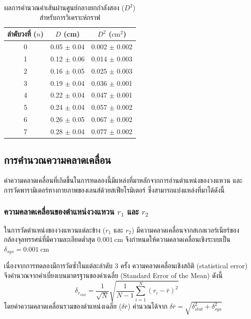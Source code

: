 \documentclass[11pt,a4paper]{article}
\begin{document}
\begin{table}[htbp]
\centering
\caption{ผลการคำนวณค่าเส้นผ่านศูนย์กลางยกกำลังสอง ($D^2$) สำหรับการวิเคราะห์กราฟ}
\renewcommand{\arraystretch}{1.2}
\begin{tabular}{|c|c|c|}
\hline
ลำดับวงที่ ($n$) & $D$ (cm) & $D^2$ ($\text{cm}^2$) \\
\hline
0 & 0.05 $\pm$ 0.04 & 0.002 $\pm$ 0.002 \\
1 & 0.12 $\pm$ 0.06 & 0.014 $\pm$ 0.003 \\
2 & 0.16 $\pm$ 0.05 & 0.025 $\pm$ 0.003 \\
3 & 0.19 $\pm$ 0.04 & 0.036 $\pm$ 0.001 \\
4 & 0.22 $\pm$ 0.04 & 0.047 $\pm$ 0.001 \\
5 & 0.24 $\pm$ 0.04 & 0.057 $\pm$ 0.002 \\
6 & 0.26 $\pm$ 0.05 & 0.067 $\pm$ 0.002 \\
7 & 0.28 $\pm$ 0.04 & 0.077 $\pm$ 0.002 \\
\hline
\end{tabular}
\end{table}




\newpage
\subsection{การคำนวณความคลาดเคลื่อน}

ค่าความคลาดเคลื่อนที่เกิดขึ้นในการทดลองนี้มีแหล่งที่มาหลักจากการอ่านตำแหน่งของวงแหวน และการวัดพารามิเตอร์ทางกายภาพของเลนส์ด้วยสเฟียโรมิเตอร์ ซึ่งสามารถแบ่งแหล่งที่มาได้ดังนี้

\subsubsection{ความคลาดเคลื่อนของตำแหน่งวงแหวน $r_1$ และ $r_2$}

ในการวัดตำแหน่งของวงแหวนแต่ละข้าง ($r_1$ และ $r_2$) มีความคลาดเคลื่อนจากสเกลเวอร์เนียร์ของกล้องจุลทรรศน์ที่มีความละเอียดต่ำสุด $0.001\ \text{cm}$ จึงกำหนดให้ความคลาดเคลื่อนเชิงระบบเป็น $\delta_{sys} = 0.001\ \text{cm}$ 

เนื่องจากการทดลองมีการวัดซ้ำในแต่ละลำดับ $3$ ครั้ง ความคลาดเคลื่อนเชิงสถิติ (statistical error) จึงคำนวณจากค่าเบี่ยงเบนมาตรฐานของค่าเฉลี่ย (Standard Error of the Mean) ดังนี้
\[
\delta_{r_{stat}} = \frac{1}{\sqrt{N}} \sqrt{\frac{1}{N-1}\sum_{i=1}^{N}(r_i-\bar{r})^2}
\]
โดยค่าความคลาดเคลื่อนรวมของตำแหน่งเฉลี่ย ($\delta \bar{r}$) คำนวณได้จาก $\delta \bar{r} = \sqrt{\delta_{stat}^2 + \delta_{sys}^2}$
\end{document}
